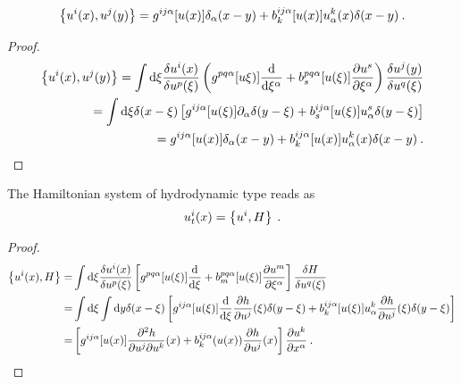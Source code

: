 
\begin{proposition}
    \begin{align}
        \left \lbrace u^i(x), u^j(y) \right \rbrace = g^{ij \alpha} [u(x)] \delta_\alpha(x-y) + b_k^{ij \alpha} [u(x)] u_\alpha^k(x) \delta(x-y) \:.
    \end{align}
\end{proposition}

\begin{proof}
    \begin{align}
        \left \lbrace u^i(x), u^j(y) \right \rbrace = \int \mathrm{d} \xi \frac{\delta u^i(x)}{\delta u^p(\xi)} \left( g^{pq \alpha}[u\xi)] \frac{\mathrm{d}}{\mathrm{d}\xi^\alpha} + b^{pq \alpha}_s[u(\xi)] \frac{\partial u^s}{\partial \xi^\alpha} \right) \frac{\delta u^j(y)}{\delta u^q(\xi)}
        \\ = \int \mathrm{d} \xi \delta(x-\xi) \left[ g^{ij \alpha}[u(\xi)] \partial_\alpha \delta(y-\xi) + b^{ij \alpha}_s[u(\xi)] u^s_\alpha \delta(y- \xi) \right] 
        \\ = g^{ij \alpha} [u(x)] \delta_\alpha(x-y) + b_k^{ij \alpha} [u(x)] u_\alpha^k(x) \delta(x-y) \:.
    \end{align}
\end{proof}

\begin{proposition}
    The Hamiltonian system of hydrodynamic type reads as
    \begin{align}
        u^i_t(x) = \left \lbrace u^i,H \right \rbrace \:.
    \end{align}
\end{proposition}
\begin{proof}
    \begin{align*}
        \left \lbrace u^i(x),H \right \rbrace 
        =& \int \mathrm{d} \xi \frac{\delta u^i(x)}{\delta u^p(\xi)} \left[ g^{pq \alpha}[u(\xi)] \frac{\mathrm{d}}{\mathrm{d}\xi} + b^{pq \alpha}_m [u(\xi)] \frac{\partial u^m}{\partial \xi^\alpha} \right] \frac{\delta H}{\delta u^q(\xi)} 
        \\ =& \int \mathrm{d} \xi \int \mathrm{d} y \delta(x-\xi) \left[  g^{ij \alpha} [u(\xi)] \frac{\mathrm{d}}{\mathrm{d}\xi} \frac{\partial h}{\partial u^j}(\xi) \delta(y-\xi) + b^{ij \alpha}_k [u(\xi)] u^k_\alpha \frac{\partial h}{\partial u^j} (\xi) \delta(y-\xi) \right]  
        \\ =& \left[ g^{ij \alpha} [u(x)] \frac{\partial ^2 h}{\partial u^j \partial u^k}(x)  + b^{ij \alpha}_k(u(x)) \frac{\partial h}{\partial u^j}(x) \right] \frac{\partial u^k}{\partial x^\alpha} \:.
    \end{align*}
\end{proof}

